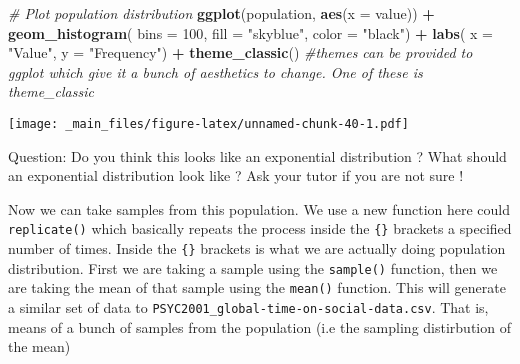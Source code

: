\documentclass[
]{book}
\newenvironment{Shaded}{\begin{snugshade}}{\end{snugshade}}
\newcommand{\AttributeTok}[1]{\textcolor[rgb]{0.13,0.29,0.53}{#1}}
\newcommand{\CommentTok}[1]{\textcolor[rgb]{0.56,0.35,0.01}{\textit{#1}}}
\newcommand{\ConstantTok}[1]{\textcolor[rgb]{0.56,0.35,0.01}{#1}}
\newcommand{\DecValTok}[1]{\textcolor[rgb]{0.00,0.00,0.81}{#1}}
\newcommand{\FunctionTok}[1]{\textcolor[rgb]{0.13,0.29,0.53}{\textbf{#1}}}
\newcommand{\NormalTok}[1]{#1}
\newcommand{\OtherTok}[1]{\textcolor[rgb]{0.56,0.35,0.01}{#1}}
\newcommand{\SpecialCharTok}[1]{\textcolor[rgb]{0.81,0.36,0.00}{\textbf{#1}}}
\newcommand{\StringTok}[1]{\textcolor[rgb]{0.31,0.60,0.02}{#1}}
\begin{document}
\begin{Shaded}
\begin{Highlighting}[]
\CommentTok{\# Plot population distribution}
\FunctionTok{ggplot}\NormalTok{(population, }\FunctionTok{aes}\NormalTok{(}\AttributeTok{x =}\NormalTok{ value)) }\SpecialCharTok{+}
  \FunctionTok{geom\_histogram}\NormalTok{( }\AttributeTok{bins =} \DecValTok{100}\NormalTok{, }\AttributeTok{fill =} \StringTok{"skyblue"}\NormalTok{, }\AttributeTok{color =} \StringTok{"black"}\NormalTok{) }\SpecialCharTok{+}
  \FunctionTok{labs}\NormalTok{(}
       \AttributeTok{x =} \StringTok{"Value"}\NormalTok{,}
       \AttributeTok{y =} \StringTok{"Frequency"}\NormalTok{) }\SpecialCharTok{+}
  \FunctionTok{theme\_classic}\NormalTok{() }\CommentTok{\#themes can be provided to ggplot which give it a bunch of aesthetics to change. One of these is theme\_classic}
\end{Highlighting}
\end{Shaded}

\texttt{[image: \_main\_files/figure-latex/unnamed-chunk-40-1.pdf]}

Question: Do you think this looks like an exponential distribution ? What should an exponential distribution look like ? Ask your tutor if you are not sure !

Now we can take samples from this population. We use a new function here could \texttt{replicate()} which basically repeats the process inside the \texttt{\{\}} brackets a specified number of times. Inside the \texttt{\{\}} brackets is what we are actually doing population distribution. First we are taking a sample using the \texttt{sample()} function, then we are taking the mean of that sample using the \texttt{mean()} function. This will generate a similar set of data to \texttt{PSYC2001\_global-time-on-social-data.csv}. That is, means of a bunch of samples from the population (i.e the sampling distirbution of the mean)

\begin{Shaded}
\end{Shaded}
\end{document}
